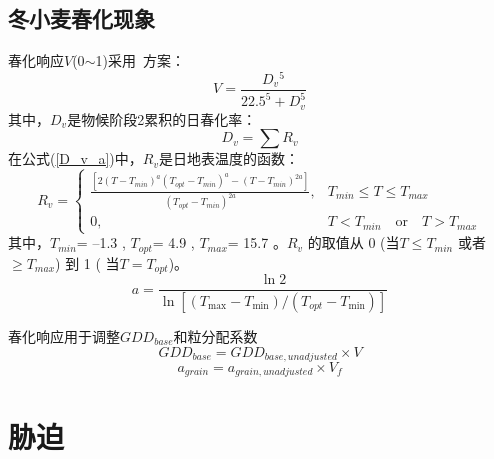 \subsection{冬小麦春化现象}
春化响应$V$(0$\sim$1)采用~\citet{streck2003incorporating}方案：
\begin{equation}
V=\frac{D_{v}{ }^{5}}{22.5^{5}+D_{v}^{5}}
\end{equation}
其中，$D_v$是物候阶段2累积的日春化率：
\begin{equation}\label{D_v_a}
D_{v}=\sum R_{v}
\end{equation}
在公式(\ref{D_v_a})中，$R_{v}$是日地表温度的函数：
\begin{equation}
R_{v} = \begin{cases} 
\frac{\left[2\left(T-T_{min}\right)^{a}\left(T_{opt}-T_{min}\right)^{a} - \left(T-T_{min}\right)^{2a}\right]}{\left(T_{opt}-T_{min}\right)^{2a}}, &T_{min} \leq T \leq T_{max} \\
0,  &T<T_{min} \quad  \text{or} \quad T>T_{max}
\end{cases}
\end{equation}
其中，$T_{min}$= –1.3 \textcelsius, $T_{opt}$= 4.9 \textcelsius, $T_{max}$= 15.7 \textcelsius。$ R_v$ 的取值从 0 (当$ T\leq T_{min}$ 或者 $ \geq  T_{max}$) 到 1 ( 当$T=T_{opt}$)。
\begin{equation}
a=\frac{\ln 2}{\ln \left[\left(T_{\max }-T_{\min }\right) /\left(T_{o p t}-T_{\min }\right)\right]}
\end{equation}

春化响应用于调整$GDD_{base}$和粒分配系数
\begin{equation}
G D D_{b a s e}=G D D_{b a s e,  { unadjusted }} \times V
\end{equation}
\begin{equation}
a_{ {grain }}=a_{ {grain,unadjusted }} \times V_{f}
\end{equation}


\section{胁迫}
